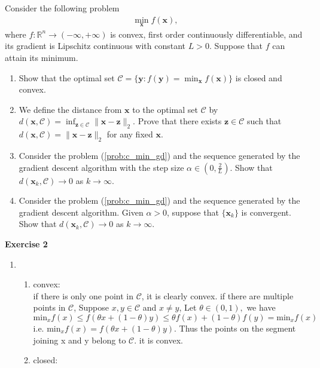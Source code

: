 \documentclass[11pt,letter,notitlepage]{article}
\begin{document}
\begin{exercise}
    Consider the following problem 
    \begin{align}\label{prob:c_min_gd}
        \min_{\mathbf{x}}f(\mathbf{x}),
    \end{align}
    where $f:\mathbb{R}^{n} \to \left( -\infty,+\infty \right)$ is convex, first order continuously differentiable, and its gradient is Lipschitz continuous with constant $L>0$. Suppose that $f$ can attain its minimum.
    \begin{enumerate}
    \item Show that the optimal set $\mathcal{C}=\{\mathbf{y}:f(\mathbf{y})=\min_{\mathbf{x}}f(\mathbf{x})\}$ is closed and convex.
    \item We define the distance from $\mathbf{x}$ to the optimal set $\mathcal{C}$ by $d(\mathbf{x},\mathcal{C})=\inf_{\mathbf{z}\in\mathcal{C}}\|\mathbf{x}-\mathbf{z}\|_2$. Prove that there exists $\mathbf{z}\in \mathcal{C}$ such that $d(\mathbf{x},\mathcal{C}) = \|\mathbf{x}-\mathbf{z}\|_2$ for any fixed $\mathbf{x}$.
    \item Consider the problem (\ref{prob:c_min_gd}) and the sequence generated by the gradient descent algorithm with the step size $\alpha \in (0,\frac{2}{L})$. Show that $d(\mathbf{x}_k,\mathcal{C})\rightarrow 0$ as $k\rightarrow\infty$. 
    \item Consider the problem (\ref{prob:c_min_gd}) and the sequence generated by the gradient descent algorithm. Given $\alpha >0$, suppose that  $\{\mathbf{x}_k\}$ is convergent. Show that $d(\mathbf{x}_k,\mathcal{C})\rightarrow 0$ as $k\rightarrow\infty$.   
\end{enumerate}
\end{exercise}
\begin{solution}
	\textbf{Exercise 2}
	\begin{enumerate}
		\item 
		\begin{enumerate}
			\item convex: \\if there is only one point in $\mathcal{C}$, it is clearly convex. if there are multiple points in $\mathcal{C}$, Suppose $x,y\in\mathcal{C}$ and $x\neq y$, Let $\theta\in(0,1),$ we have
			$$\text{min}_x f(x)\leqslant f(\theta x+(1-\theta)y)\leqslant\theta f(x)+(1-\theta)f(y)=\text{min}_x f(x)$$
			i.e. $\text{min}_xf(x)=f(\theta x+(1-\theta)y)$. Thus the points on the segment joining x and y belong to $\mathcal{C}$. it is convex.
			
			\item closed: \\
			
		\end{enumerate}
	\end{enumerate}
\end{solution}
\end{document}
